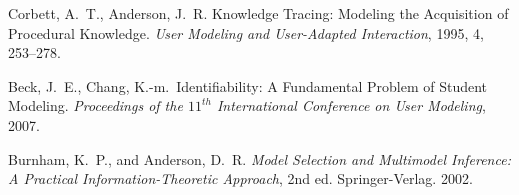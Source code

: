\documentclass[11pt,letterpaper]{article}
\begin{document}
\begin{thebibliography}{9}

  Corbett, A.\ T., Anderson, J.\ R. Knowledge Tracing:  Modeling 
the Acquisition of Procedural Knowledge.  \emph{User Modeling and
 User-Adapted Interaction}, 1995, 4, 253--278.

  Beck, J.\ E., Chang, K.-m.\ Identifiability: A Fundamental Problem of
  Student Modeling.
  \emph{Proceedings of the $11^{th}$ International Conference on User 
    Modeling}, 2007.

Burnham, K.~P., and Anderson, D.~R. \emph{Model
  Selection and Multimodel Inference: A Practical
  Information-Theoretic Approach}, 2nd ed. Springer-Verlag. 2002.

\end{thebibliography}
\end{document}

